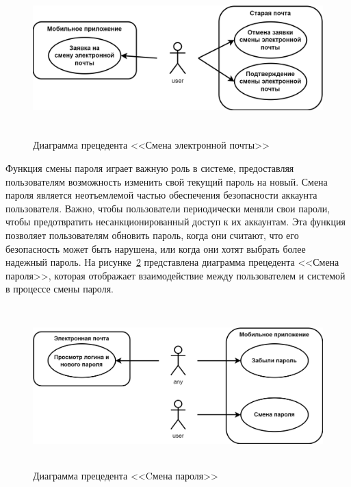 \begin{figure}[!htb]
    \centering

    \includegraphics[height=6cm]
    {images/UML/use_case/users/users_change_email.png}

    \caption{Диаграмма прецедента <<Смена электронной почты>>}

    \label{fig:UML_use_case_change_email}
\end{figure}

Функция смены пароля играет важную роль в системе,
предоставляя пользователям возможность изменить свой текущий пароль на новый.
Смена пароля является неотъемлемой частью обеспечения безопасности аккаунта пользователя.
Важно, чтобы пользователи периодически меняли свои пароли,
чтобы предотвратить несанкционированный доступ к их аккаунтам.
Эта функция позволяет пользователям обновить пароль, когда они считают,
что его безопасность может быть нарушена, или когда они хотят выбрать более надежный пароль.
На рисунке~\ref{fig:UML_use_case_change_password} представлена диаграмма прецедента <<Смена пароля>>,
которая отображает взаимодействие между пользователем и системой в процессе
смены пароля.

\begin{figure}[!htb]
    \centering

    \includegraphics[height=6.2cm]
    {images/UML/use_case/users/users_change_password.png}

    \caption{Диаграмма прецедента <<Cмена пароля>>}

    \label{fig:UML_use_case_change_password}
\end{figure}

